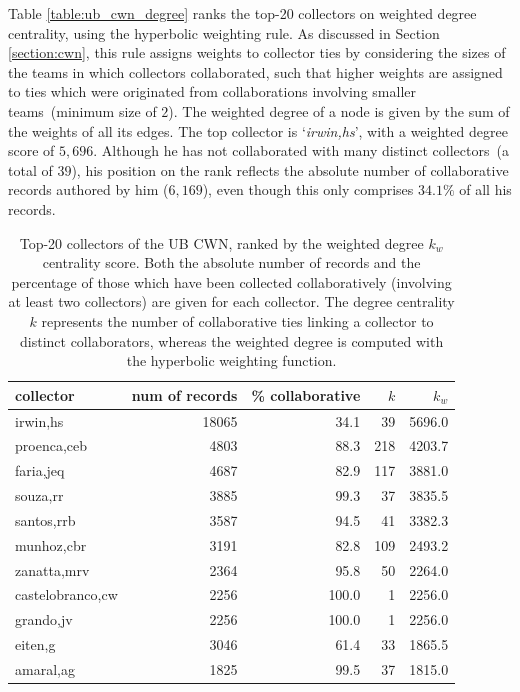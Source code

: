 Table \ref{table:ub_cwn_degree} ranks the top-20 collectors on weighted degree centrality, using the hyperbolic weighting rule.
As discussed in Section \ref{section:cwn}, this rule assigns weights to collector ties by considering the sizes of the teams in which collectors collaborated, such that higher weights are assigned to ties which were originated from collaborations involving smaller teams~(minimum size of $2$).
The weighted degree of a node is given by the sum of the weights of all its edges.
The top collector is `\textit{irwin,hs}', with a weighted degree score of $5,696$.
Although he has not collaborated with many distinct collectors~(a total of $39$), his position on the rank reflects the absolute number of collaborative records authored by him ($6,169$), even though this only comprises $34.1\%$ of all his records. 
%
\begin{table}[t]
  \caption[Top-20 collectors of the UB CWN, ranked by the weighted degree centrality score.]{Top-20 collectors of the UB CWN, ranked by the weighted degree $k_w$ centrality score. Both the absolute number of records and the percentage of those which have been collected collaboratively (involving at least two collectors) are given for each collector. The degree centrality $k$ represents the number of collaborative ties linking a collector to distinct collaborators, whereas the weighted degree is computed with the hyperbolic weighting function.}
  \begin{center}
  \begin{tabular}{l r r r r}
      collector & num of records & \% collaborative & $k$ & $k_w$ \\
      \hline
      irwin,hs & 18065 & 34.1 & 39 & 5696.0 \\
      proenca,ceb & 4803 & 88.3 & 218 & 4203.7 \\
      faria,jeq & 4687 & 82.9 & 117 & 3881.0 \\
      souza,rr & 3885 & 99.3 & 37 & 3835.5 \\
      santos,rrb & 3587 & 94.5 & 41 & 3382.3 \\
      munhoz,cbr & 3191 & 82.8 & 109 & 2493.2 \\
      zanatta,mrv & 2364 & 95.8 & 50 & 2264.0 \\
      castelobranco,cw & 2256 & 100.0 & 1 & 2256.0 \\
      grando,jv & 2256 & 100.0 & 1 & 2256.0 \\
      eiten,g & 3046 & 61.4 & 33 & 1865.5 \\
      amaral,ag & 1825 & 99.5 & 37 & 1815.0 \\

\end{tabular}
\end{center}
\end{table}
